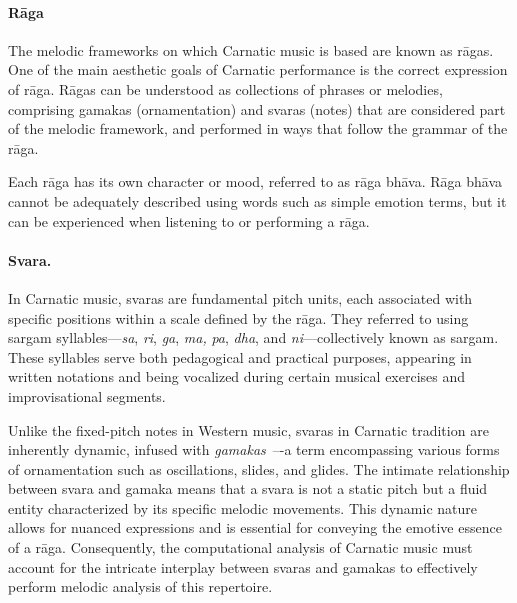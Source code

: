 \paragraph*{R\={a}ga}
The melodic frameworks on which Carnatic music is based are known as r\={a}gas. One of the main aesthetic goals of Carnatic performance is the correct expression of r\={a}ga. R\={a}gas can be understood as collections of phrases or melodies, comprising gamakas (ornamentation) and svaras (notes) that are considered part of the melodic framework, and performed in ways that follow the grammar of the r\={a}ga.

Each r\={a}ga has its own character or mood, referred to as r\={a}ga bh\={a}va. R\={a}ga bhāva cannot be adequately described using words such as simple emotion terms, but it can be experienced when listening to or performing a r\={a}ga.


\paragraph*{Svara.}
In Carnatic music, svaras are fundamental pitch units, each associated with specific positions within a scale defined by the rāga. They referred to using sargam syllables—\textit{sa}, \textit{ri}, \textit{ga}, \textit{ma,} \textit{pa}, \textit{dha}, and \textit{ni}—collectively known as sargam. These syllables serve both pedagogical and practical purposes, appearing in written notations and being vocalized during certain musical exercises and improvisational segments.

Unlike the fixed-pitch notes in Western music, svaras in Carnatic tradition are inherently dynamic, infused with \textit{gamakas}~\citep{ramanathan-sargam}–-a term encompassing various forms of ornamentation such as oscillations, slides, and glides. The intimate relationship between svara and gamaka means that a svara is not a static pitch but a fluid entity characterized by its specific melodic movements. This dynamic nature allows for nuanced expressions and is essential for conveying the emotive essence of a r\={a}ga. Consequently, the computational analysis of Carnatic music must account for the intricate interplay between svaras and gamakas to effectively perform melodic analysis of this repertoire.


